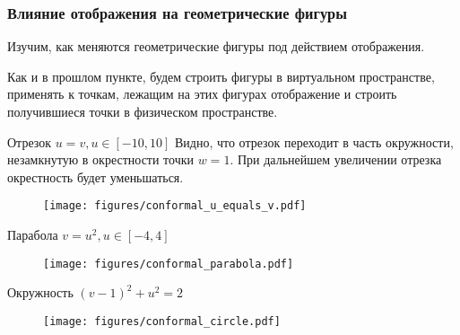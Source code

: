 \begin{frame}\frametitle{Влияние отображения на геометрические фигуры}
	Изучим, как меняются геометрические фигуры под действием отображения.

	Как и в прошлом пункте, будем строить фигуры в виртуальном пространстве,
	применять к точкам, лежащим на этих фигурах отображение и строить
	получившиеся точки в физическом пространстве.
\end{frame}

\begin{frame}{Отрезок \(u = v, u \in [-10, 10]\)}
	Видно, что отрезок переходит в часть окружности, незамкнутую
	в окрестности точки \(w = 1\).
	При дальнейшем увеличении отрезка окрестность будет уменьшаться.
	\begin{figure}
		\centering
		\texttt{[image: figures/conformal\_u\_equals\_v.pdf]}
	\end{figure}
\end{frame}

\begin{frame}{Парабола \(v = u^2, u \in [-4, 4]\)}
	\begin{figure}
		\centering
		\texttt{[image: figures/conformal\_parabola.pdf]}
	\end{figure}
\end{frame}

\begin{frame}{Окружность \((v-1)^2 + u^2 = 2\)}
	\begin{figure}
		\centering
		\texttt{[image: figures/conformal\_circle.pdf]}
	\end{figure}
\end{frame}
